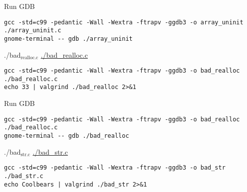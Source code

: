 \documentclass[11pt]{article}
\begin{document}
Run GDB
\begin{verbatim}
gcc -std=c99 -pedantic -Wall -Wextra -ftrapv -ggdb3 -o array_uninit ./array_uninit.c
gnome-terminal -- gdb ./array_uninit
\end{verbatim}

\item ./bad\(_{\text{realloc.c}}\)
\label{sec:orgb40d71f}
\url{./bad\_realloc.c}

\begin{verbatim}
gcc -std=c99 -pedantic -Wall -Wextra -ftrapv -ggdb3 -o bad_realloc ./bad_realloc.c
echo 33 | valgrind ./bad_realloc 2>&1
\end{verbatim}

Run GDB
\begin{verbatim}
gcc -std=c99 -pedantic -Wall -Wextra -ftrapv -ggdb3 -o bad_realloc ./bad_realloc.c
gnome-terminal -- gdb ./bad_realloc
\end{verbatim}

\item ./bad\(_{\text{str.c}}\)
\label{sec:org9721dd1}
\url{./bad\_str.c}

\begin{verbatim}
gcc -std=c99 -pedantic -Wall -Wextra -ftrapv -ggdb3 -o bad_str ./bad_str.c
echo Coolbears | valgrind ./bad_str 2>&1
\end{verbatim}
\end{document}

